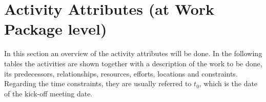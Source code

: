 \chapter{Activity Attributes (at Work Package level)}
In this section an overview of the activity attributes will be done. In the following tables the activities are shown together with a description of the work to be done, its predecessors, relationships, resources, efforts, locations and constraints. Regarding the time constraints, they are usually referred to $t_{0}$, which is the date of the kick-off meeting date.







%
